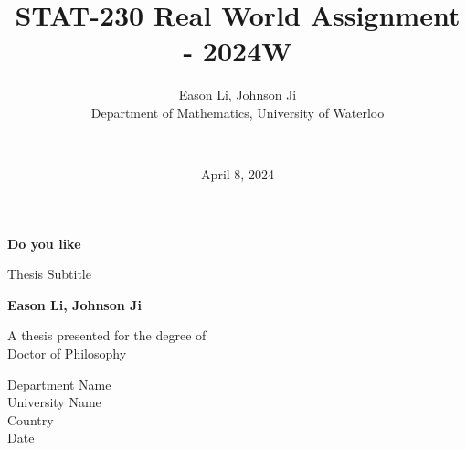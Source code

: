 \documentclass{article}
\title{STAT-230 Real World Assignment - 2024W}
\author{
    Eason Li, Johnson Ji \\
    Department of Mathematics, University of Waterloo \and \\
}
\date{April 8, 2024} %
\begin{document}
\begin{titlepage}
    \begin{center}
        \vspace*{1cm}
            
        \Huge
        \textbf{Do you like }
            
        \vspace{0.5cm}
        \LARGE
        Thesis Subtitle
            
        \vspace{1.5cm}
            
        \textbf{Eason Li, Johnson Ji}
            
        \vfill
            
        A thesis presented for the degree of\\
        Doctor of Philosophy
            
        \vspace{0.8cm}
            
        \Large
        Department Name\\
        University Name\\
        Country\\
        Date
            
    \end{center}
\end{titlepage}
\end{document}
